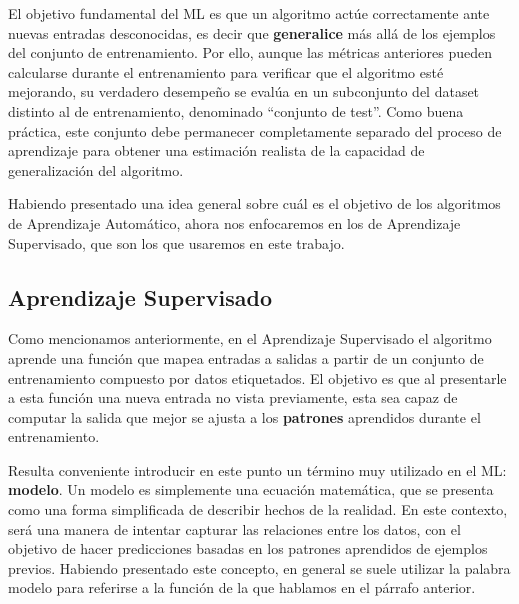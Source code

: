 \documentclass[../../main.tex]{subfiles}
\begin{document}
El objetivo fundamental del ML es que un algoritmo actúe correctamente ante nuevas
entradas desconocidas, es decir que \textbf{generalice} más allá de los ejemplos del
conjunto de entrenamiento. Por ello, aunque las métricas anteriores pueden calcularse
durante el entrenamiento para verificar que el algoritmo esté mejorando, su verdadero
desempeño se evalúa en un subconjunto del dataset distinto al de entrenamiento, denominado
``conjunto de test''. Como buena práctica, este conjunto debe permanecer completamente
separado del proceso de aprendizaje para obtener una estimación realista de la capacidad
de generalización del algoritmo.

\bigskip
Habiendo presentado una idea general sobre cuál es el objetivo de los algoritmos de
Aprendizaje Automático, ahora nos enfocaremos en los de Aprendizaje Supervisado, que son
los que usaremos en este trabajo.

\subsection{Aprendizaje Supervisado}
Como mencionamos anteriormente, en el Aprendizaje Supervisado el algoritmo aprende una
función que mapea entradas a salidas a partir de un conjunto de entrenamiento compuesto
por datos etiquetados. El objetivo es que al presentarle a esta función una nueva entrada
no vista previamente, esta sea capaz de computar la salida que mejor se ajusta a los
\textbf{patrones} aprendidos durante el entrenamiento.

Resulta conveniente introducir en este punto un término muy utilizado en el ML:
\textbf{modelo}. Un modelo es simplemente una ecuación matemática, que se presenta como
una forma simplificada de describir hechos de la realidad. En este contexto, será una
manera de intentar capturar las relaciones entre los datos, con el objetivo de hacer
predicciones basadas en los patrones aprendidos de ejemplos previos. Habiendo presentado
este concepto, en general se suele utilizar la palabra modelo para referirse a la función
de la que hablamos en el párrafo anterior.
\end{document}
